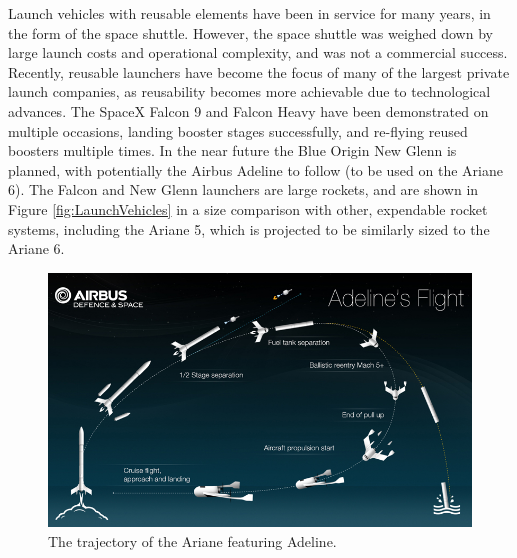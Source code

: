     
    Launch vehicles with reusable elements have been in service for many years, in the form of the space shuttle. However, the space shuttle was weighed down by large launch costs and operational complexity, and was not a commercial success\cite{Launius2006}. Recently, reusable launchers have become the focus of many of the largest private launch companies, as reusability becomes more achievable due to technological advances\cite{Foust2018,Mosher2018}. The SpaceX Falcon 9 and Falcon Heavy have been demonstrated on multiple occasions, landing booster stages successfully, and re-flying reused boosters multiple times\cite{Foust2018}. In the near future the Blue Origin New Glenn is planned\cite{Foust2018}, with potentially the Airbus Adeline to follow (to be used on the Ariane 6)\cite{Adeline}. The Falcon and New Glenn launchers are large rockets, and are shown in Figure \ref{fig:LaunchVehicles} in a size comparison with other, expendable rocket systems, including the Ariane 5, which is projected to be similarly sized to the Ariane 6. 
     

    
    
    
    
    
    \begin{figure}[ht]
    	\centering
    	\includegraphics[width=0.7\linewidth]{figures/2_literature-review/visuel_adeline1}
    	\caption{The trajectory of the Ariane featuring Adeline\cite{Adelineb}.}
    	\label{fig:visuel_adeline1}
    \end{figure}
    
